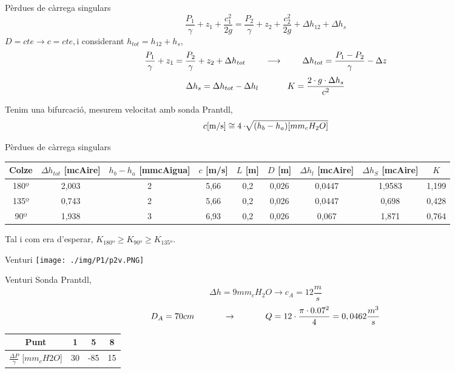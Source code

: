 \documentclass[10pt]{beamer}
\begin{document}
\begin{frame}{Pèrdues de càrrega singulars}
$$\frac{P_1}{\gamma} + z_1 + \frac{c_1 ^2}{2g} =\frac{P_2}{\gamma} + z_2 + \frac{c_2 ^2}{2g} + \Delta h_{12}  + \Delta h_s$$
$D = cte \rightarrow c = cte, $i considerant $h_{tot} = h_{12} + h_s$,
$$\frac{P_1}{\gamma} + z_1  =\frac{P_2}{\gamma} + z_2  + \Delta h_{tot} \hspace{0.8cm} \longrightarrow \hspace{0.8cm} \Delta h_{tot} = \frac{P_1 - P_2}{\gamma} -\Delta z$$
$$\Delta h_s = \Delta h_{tot} - \Delta h_{l} \hspace{1.2cm} K = \frac{2\cdot g \cdot \Delta h_s}{c^2}$$

Tenim una bifurcació, mesurem velocitat amb sonda Prantdl,
$$c\hbox{[m/s]} \cong 4\cdot \sqrt[]{(h_b - h_a)[mm_cH_2O]}$$
\end{frame}

\begin{frame}{Pèrdues de càrrega singulars}
  \begin{table}[h!]
    \centering
    \begin{adjustbox}{max width=1.05\textwidth}
    \begin{tabular}{|c|c|c|c|c|c|c|c|c|}
      \hline Colze & $\Delta h_{tot}$ [mcAire] & $h_b-h_a$ [mmcAigua] & $c$ [m/s]& $L$ [m] & $D$ [m]& $\Delta h_l$ [mcAire]& $\Delta h_S$ [mcAire]& $K$ \\ [2pt]
      \hline 180º & 2,003 & 2 & 5,66 & 0,2 & 0,026 & 0,0447 & 1,9583 & 1,199 \\
      \hline 135º & 0,743 & 2 & 5,66 & 0,2 & 0,026 & 0,0447 & 0,698 & 0,428 \\
      \hline 90º & 1,938 & 3 & 6,93 & 0,2 & 0,026 & 0,067 & 1,871 & 0,764 \\\hline
    \end{tabular}
  \end{adjustbox}
  \end{table}
\vspace{1cm}
Tal i com era d'esperar, $K_{180º} \geq K_{90º} \geq K_{135º}$.

\end{frame}

\begin{frame}{Venturi}
  \texttt{[image: ./img/P1/p2v.PNG]}
\end{frame}
\begin{frame}{Venturi}
  Sonda Prantdl,
$$\Delta h = 9 mm_cH_2O \rightarrow c_A = 12 \frac{m}{s}$$
$$D_A = 70 cm \hspace{1.2cm}\rightarrow \hspace{1.2cm} Q = 12 \cdot \frac{\pi \cdot 0.07^2}{4} = 0,0462 \frac{m^3}{s}$$

\begin{table}[h!]
\centering
\begin{tabular}{|c|c|c|c|}
\hline
Punt & 1 & 5 & 8 \\ [2pt]
\hline
$\frac{\Delta P}{\gamma}$ [$mm_cH2O$] & 30 & -85 & 15 \\ [2 pt]
\hline
\end{tabular}
\end{table}

\end{frame}
\end{document}
